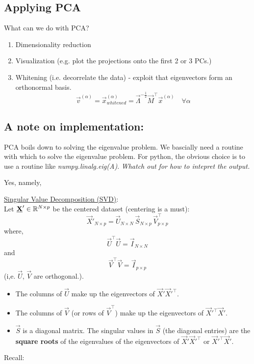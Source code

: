 \subsection{Applying PCA}

What can we do with PCA?

\begin{enumerate}
\item Dimensionality reduction
\item Visualization (e.g. plot the projections onto the first 2 or 3 PCs.)
\item Whitening (i.e. decorrelate the data) - exploit that eigenvectors form an orthonormal basis.
$$
\vec v^{(\alpha)} = \vec x_{whitened}^{(\alpha)} = \vec{\Lambda}^{-\frac{1}{2}}\vec{M}^\top\vec{x}^{(\alpha)}
\quad
\forall \alpha
$$


\end{enumerate}

\newpage
\subsection{A note on implementation:}


PCA boils down to solving the eigenvalue problem.
We bascially need a routine with which to solve the eigenvalue problem. For python, the obvious choice is to use a routine like \textit{numpy.linalg.eig(A)}. \emph{Whatch out for how to intepret the output.}


Yes, namely,

\underline{Singular Value Decomposition (SVD)}:\\
Let $\underline{\mathbf{X}}' \in \mathbb{R}^{N \times p}$ be the centered dataset (centering is a must):
$$
\vec X'_{N \times p} = \vec U_{N \times N} \, \vec S_{N \times p} \, \vec V^\top_{{p \times p}}
$$
where,
$$
\vec U^\top \vec U = \vec I_{N \times N}
$$ and 
$$
\vec V^\top \vec V = \vec I_{p \times p}
$$ (i,e. $\vec U$, $\vec V$ are orthogonal.).
\begin{itemize}
\item The columns of $\vec U$ make up the eigenvectors of $\vec X'\vec X'^\top$.
\item The columns of $\vec V$ (or rows of $\vec V^\top$) make up the eigenvectors of $\vec X'^\top\vec X'$.
\item $\vec S$ is a diagonal matrix. The singular values in $\vec S$ (the diagonal entries) are the \textbf{square roots} of the  eigenvalues of the eigenvectors of $\vec X'\vec X'^\top$ or $\vec X'^\top\vec X'$.

\end{itemize}
Recall:


